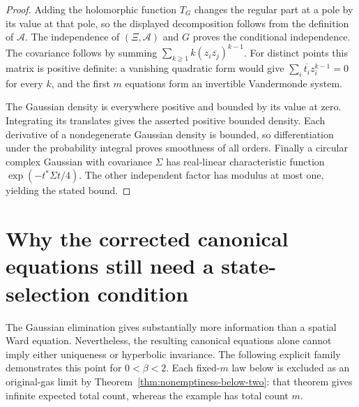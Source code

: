 \documentclass[11pt,a4paper]{article}
\numberwithin{equation}{section}
\theoremstyle{definition}
\theoremstyle{remark}
\begin{document}
\begin{proof}
Adding the holomorphic function $T_G$ changes the regular part at a
pole by its value at that pole, so the displayed decomposition follows
from the definition of $\mathcal A$. The independence of
$(\Xi,\mathcal A)$ and $G$ proves the conditional independence.
The covariance follows by summing
$\sum_{k\ge1}k(z_i\overline{z_j})^{k-1}$.
For distinct points this matrix is positive definite: a vanishing
quadratic form would give
$\sum_i\overline{t_i}z_i^{k-1}=0$ for every $k$, and the first $m$
equations form an invertible Vandermonde system.

The Gaussian density is everywhere positive and bounded by its value
at zero. Integrating its translates gives the asserted positive bounded
density. Each derivative of a nondegenerate Gaussian density is bounded,
so differentiation under the probability integral proves smoothness of
all orders. Finally a circular complex Gaussian with covariance
$\Sigma$ has real-linear characteristic function
$\exp(-t^*\Sigma t/4)$. The other independent factor has modulus at most
one, yielding the stated bound.
\end{proof}

\section{Why the corrected canonical equations still need a state-selection condition}
\label{sec:finite-green-gibbs-obstruction}

The Gaussian elimination gives substantially more information than a
spatial Ward equation. Nevertheless, the resulting canonical equations
alone cannot imply either uniqueness or hyperbolic invariance. The
following explicit family demonstrates this point for $0<\beta<2$.
Each fixed-$m$ law below is excluded as an original-gas limit by
Theorem~\ref{thm:nonemptiness-below-two}: that theorem gives infinite
expected total count, whereas the example has total count $m$.
\end{document}

